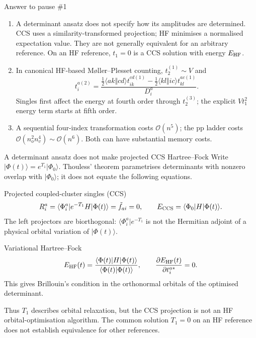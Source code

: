 \documentclass[aspectratio=169,10pt]{beamer}
\newcounter{thinkctr}
\newcommand{\thinka}[1]{%
  \vfill
  \begin{tcolorbox}[enhanced,colback=paleteal,colframe=teal,boxrule=1.2pt,arc=4pt,
    grow to left by=6mm,grow to right by=6mm,
    left=16pt,right=16pt,top=16pt,bottom=18pt,
    fonttitle=\bfseries\Large,fontupper=\large,
    title={Answer to pause \#\thethinkctr}]
  #1
  \end{tcolorbox}
  \vfill}
\newcommand{\ket}[1]{\vert #1\rangle}
\newcommand{\bra}[1]{\langle #1\vert}
\newcommand{\braket}[2]{\langle #1\vert #2\rangle}
\newcommand{\ph}{\Phi_0}
\newcommand{\as}[4]{\langle #1#2\Vert #3#4\rangle}
\newcommand{\ft}{\tilde f}
\begin{document}
\begin{frame}{Answer to pause \#1}
\thinka{\normalsize
\begin{enumerate}
\item A determinant ansatz does not specify how its amplitudes are determined. CCS uses a similarity-transformed projection; HF minimises a normalised expectation value. They are not generally equivalent for an arbitrary reference. On an HF reference, $t_1=0$ is a CCS solution with energy $E_{\rm HF}$.
\item In canonical HF-based M\o ller--Plesset counting, $t_2^{(1)}\sim V$ and
\[
 t_i^{a(2)}=\frac{\tfrac12\as akcd t_{ik}^{cd(1)}-\tfrac12\as klic t_{kl}^{ac(1)}}{D_i^a}.
\]
Singles first affect the energy at fourth order through $t_2^{(3)}$; the explicit $Vt_1^2$ energy term starts at fifth order.
\item A sequential four-index transformation costs $\mathcal O(n^5)$; the pp ladder costs $\mathcal O(n_o^2n_v^4)\sim\mathcal O(n^6)$. Both can have substantial memory costs.
\end{enumerate}}
\end{frame}

\begin{frame}{A determinant ansatz does not make projected CCS Hartree--Fock}
\small
Write $\ket{\Phi(t)}=e^{T_1}\ket{\ph}$. Thouless' theorem parametrises determinants
with nonzero overlap with $\ket{\ph}$; it does not equate the following equations.
\begin{block}{Projected coupled-cluster singles (CCS)}
\[
 R_i^a=\bra{\Phi_i^a}e^{-T_1}H\ket{\Phi(t)}=\ft_{ai}=0,
 \qquad E_{\rm CCS}=\bra{\ph}H\ket{\Phi(t)}.
\]
The left projectors are biorthogonal: $\bra{\Phi_i^a}e^{-T_1}$ is not the
Hermitian adjoint of a physical orbital variation of $\ket{\Phi(t)}$.
\end{block}
\begin{block}{Variational Hartree--Fock}
\[
 E_{\rm HF}(t)=\frac{\bra{\Phi(t)}H\ket{\Phi(t)}}{\braket{\Phi(t)}{\Phi(t)}},
 \qquad \frac{\partial E_{\rm HF}(t)}{\partial t_i^{a*}}=0.
\]
This gives Brillouin's condition in the orthonormal orbitals of the optimised determinant.
\end{block}
Thus $T_1$ describes orbital relaxation, but the CCS projection is not an HF
orbital-optimisation algorithm. The common solution $T_1=0$ on an HF reference
does not establish equivalence for other references.
\end{frame}
\end{document}
